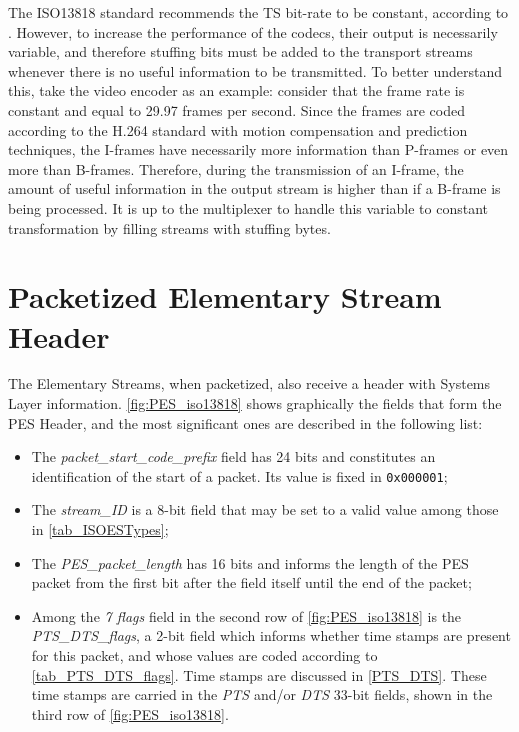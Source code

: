 \documentclass[
	12pt,				%
	openright,			%
	twoside,			%
	a4paper,			%
	brazil,
	french,				%
	english
	]{abntex2}
\begin{document}
The ISO13818 standard recommends the TS bit-rate to be constant, according to . However, to increase the performance of the codecs, their output  is necessarily variable, and therefore stuffing bits must be added to the transport streams whenever there is no useful information to be transmitted. To better understand this, take the video encoder as an example: consider that the frame rate is constant and equal to 29.97 frames per second. Since the frames are coded according to the H.264 standard with motion compensation and prediction techniques, the I-frames have necessarily more information than P-frames or even more than B-frames. Therefore, during the transmission of an I-frame, the amount of useful information in the output stream is higher than if a B-frame is being processed. It is up to the multiplexer to handle this variable to constant transformation by filling streams with stuffing bytes.

\section{Packetized Elementary Stream Header}

The Elementary Streams, when packetized, also receive a header with Systems Layer information. \autoref{fig:PES_iso13818} shows graphically the fields that form the PES Header, and the most significant ones are described in the following list:
\begin{itemize}
\item{The \textit{packet\_start\_code\_prefix} field has 24 bits and constitutes an identification of the start of a packet. Its value is fixed in \texttt{0x000001};}
\item{The \textit{stream\_ID} is a 8-bit field that may be set to a valid value among those in \autoref{tab_ISOESTypes};}
\item{The \textit{PES\_packet\_length} has 16 bits and informs the length of the PES packet from the first bit after the field itself until the end of the packet;}
\item{Among the \textit{7 flags} field in the second row of \autoref{fig:PES_iso13818} is the \textit{PTS\_DTS\_flags}, a 2-bit field which informs whether time stamps are present for this packet, and whose values are coded according to \autoref{tab_PTS_DTS_flags}. Time stamps are discussed in \autoref{PTS_DTS}. These time stamps are carried in the \textit{PTS} and/or \textit{DTS} 33-bit fields, shown in the third row of \autoref{fig:PES_iso13818}.}
\end{itemize}
\end{document}
